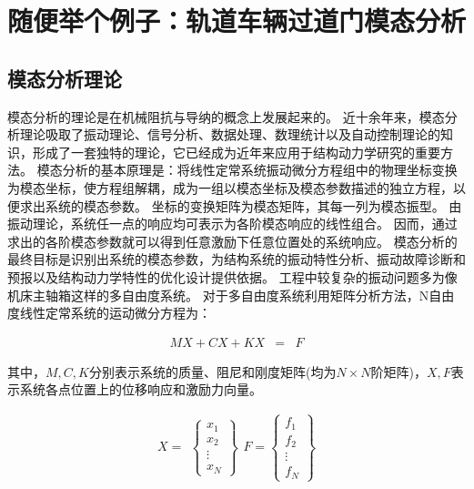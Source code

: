 \section{随便举个例子：轨道车辆过道门模态分析}
\subsection{模态分析理论}
模态分析的理论是在机械阻抗与导纳的概念上发展起来的。
近十余年来，模态分析理论吸取了振动理论、信号分析、数据处理、数理统计以及自动控制理论的知识，形成了一套独特的理论，它已经成为近年来应用于结构动力学研究的重要方法。
模态分析的基本原理是：将线性定常系统振动微分方程组中的物理坐标变换为模态坐标，使方程组解耦，成为一组以模态坐标及模态参数描述的独立方程，以便求出系统的模态参数。
坐标的变换矩阵为模态矩阵，其每一列为模态振型。
由振动理论，系统任一点的响应均可表示为各阶模态响应的线性组合。
因而，通过求出的各阶模态参数就可以得到任意激励下任意位置处的系统响应。
模态分析的最终目标是识别出系统的模态参数，为结构系统的振动特性分析、振动故障诊断和预报以及结构动力学特性的优化设计提供依据。
工程中较复杂的振动问题多为像机床主轴箱这样的多自由度系统\cite{2001Applying}。
对于多自由度系统利用矩阵分析方法，N自由度线性定常系统的运动微分方程为：

\begin{eqnarray}
    MX+CX+KX&=&F
\end{eqnarray}

其中，$M,C,K$分别表示系统的质量、阻尼和刚度矩阵(均为$N\times{N}$阶矩阵)，$X,F$表示系统各点位置上的位移响应和激励力向量。

\begin{eqnarray}
    X=\begin{array}{c}
        \left\{\begin{array}{c}
            x_{1}\\
            x_{2}\\
            \vdots\\
            x_{N}
        \end{array}\right\}
    \end{array}
    F=\left\{\begin{array}{c}
        f_{1}\\
        f_{2}\\
        \vdots\\
        f_{N}
    \end{array}\right\}
\end{eqnarray}
